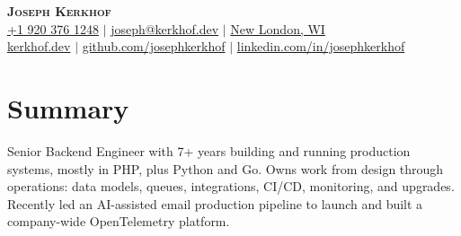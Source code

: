 \documentclass[letterpaper,11pt]{article}
\begin{document}

    \begin{center}
        \textbf{\Huge \scshape Joseph Kerkhof} \\ \vspace{3pt}
        \small
        \faMobile{} \hspace{.5pt} \href{tel:19203761248}{+1 920 376 1248}
        $|$
        \faAt{} \hspace{.5pt} \href{mailto:joseph@kerkhof.dev}{joseph@kerkhof.dev}
        $|$
        \faMapMarker{} \hspace{.5pt} \href{https://maps.app.goo.gl/owhR2Cu3Db1u95g27}{New London, WI}
        \\ \vspace{1pt}
        \faGlobe{} \hspace{.5pt} \href{https://kerkhof.dev}{kerkhof.dev}
        $|$
        \faGithub{} \hspace{.5pt} \href{https://github.com/josephkerkhof}{github.com/josephkerkhof}
        $|$
        \faLinkedin{} \hspace{.5pt} \href{https://www.linkedin.com/in/josephkerkhof/}{linkedin.com/in/josephkerkhof}
    \end{center}




    \section{Summary}
    \vspace{3pt}
    Senior Backend Engineer with 7+ years building and running production systems, mostly in PHP, plus Python and Go.
    Owns work from design through operations: data models, queues, integrations, CI/CD, monitoring, and upgrades.
    Recently led an AI-assisted email production pipeline to launch and built a company-wide OpenTelemetry platform.

\end{document}
